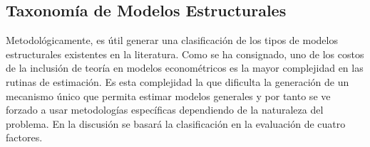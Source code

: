 \documentclass[
]{book}
\begin{document}
\subsection{Taxonomía de Modelos Estructurales}\label{taxonomuxeda-de-modelos-estructurales}

Metodológicamente, es útil generar una clasificación de los tipos de modelos estructurales existentes en la literatura. Como se ha consignado, uno de los costos de la inclusión de teoría en modelos econométricos es la mayor complejidad en las rutinas de estimación. Es esta complejidad la que dificulta la generación de un mecanismo único que permita estimar modelos generales y por tanto se ve forzado a usar metodologías específicas dependiendo de la naturaleza del problema. En la discusión se basará la clasificación en la evaluación de cuatro factores.
\end{document}
